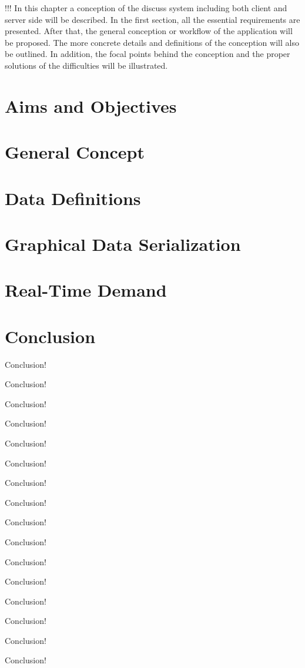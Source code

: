 !!! In this chapter a conception of the discuss system including both client and server side will be described. In the first section, all the essential requirements are presented. After that, the general conception or workflow of the application will be proposed. The more concrete details and definitions of the conception will also be outlined. In addition, the focal points behind the conception and the proper solutions of the difficulties will be illustrated.


\section{Aims and Objectives}\label{sec:aims}

\section{General Concept}

\section{Data Definitions}\label{sec:data-concept}

\section{Graphical Data Serialization}\label{sec:graphical-data-serialization-concept}

\section{Real-Time Demand}\label{sec:realtime-concept}


% 

\section{Conclusion}


Conclusion!

Conclusion!

Conclusion!

Conclusion!

Conclusion!

Conclusion!

Conclusion!

Conclusion!


Conclusion!

Conclusion!

Conclusion!

Conclusion!


Conclusion!

Conclusion!

Conclusion!

Conclusion!

